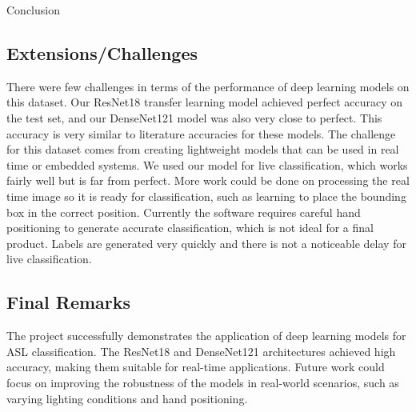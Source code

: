\documentclass[12pt, a4paper]{article}
\begin{document}
\begin{section}{Conclusion}
    \subsection{Extensions/Challenges}
    There were few challenges in terms of the performance of deep learning models on this dataset. Our ResNet18 transfer learning model achieved perfect accuracy on the test set, and our DenseNet121 model was also very close to perfect. This accuracy is very similar to literature accuracies for these models. The challenge for this dataset comes from creating lightweight models that can be used in real time or embedded systems. We used our model for live classification, which works fairly well but is far from perfect. More work could be done on processing the real time image so it is ready for classification, such as learning to place the bounding box in the correct position. Currently the software requires careful hand positioning to generate accurate classification, which is not ideal for a final product. Labels are generated very quickly and there is not a noticeable delay for live classification.
    \subsection{Final Remarks}
    The project successfully demonstrates the application of deep learning models for ASL classification. The ResNet18 and DenseNet121 architectures achieved high accuracy, making them suitable for real-time applications. Future work could focus on improving the robustness of the models in real-world scenarios, such as varying lighting conditions and hand positioning.
\end{section}


\end{document}
